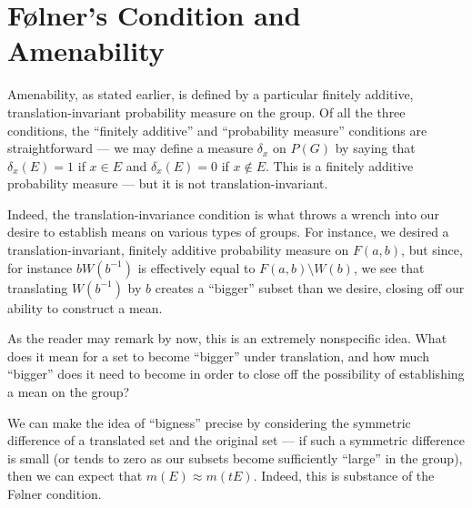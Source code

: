 \documentclass[10pt]{mypackage2}
\begin{document}
\section{Følner's Condition and Amenability}\label{sec:folner_condition}%
Amenability, as stated earlier, is defined by a particular finitely additive, translation-invariant probability measure on the group. Of all the three conditions, the ``finitely additive'' and ``probability measure'' conditions are straightforward --- we may define a measure $\delta_x$ on $P(G)$ by saying that $\delta_x(E) = 1$ if $x\in E$ and $\delta_x(E) = 0$ if $x\notin E$. This is a finitely additive probability measure --- but it is not translation-invariant.\newline

Indeed, the translation-invariance condition is what throws a wrench into our desire to establish means on various types of groups. For instance, we desired a translation-invariant, finitely additive probability measure on $F(a,b)$, but since, for instance $bW\left( b^{-1} \right)$ is effectively equal to $F(a,b)\setminus W(b)$, we see that translating $W\left( b^{-1} \right)$ by $b$ creates a ``bigger'' subset than we desire, closing off our ability to construct a mean.\newline

As the reader may remark by now, this is an extremely nonspecific idea. What does it mean for a set to become ``bigger'' under translation, and how much ``bigger'' does it need to become in order to close off the possibility of establishing a mean on the group?\newline

We can make the idea of ``bigness'' precise by considering the symmetric difference of a translated set and the original set --- if such a symmetric difference is small (or tends to zero as our subsets become sufficiently ``large'' in the group), then we can expect that $m\left( E \right) \approx m\left( tE \right)$. Indeed, this is substance of the Følner condition.
\end{document}
